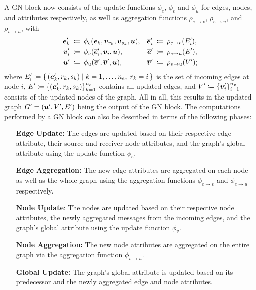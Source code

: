 A GN block now consists of the update functions $\phi_e$, $\phi_v$ and $\phi_u$ for edges,
nodes, and attributes respectively, as well as aggregation functions $\rho_{e \to v}$,
$\rho_{e \to u}$, and $\rho_{v \to u}$, with
\begin{align*}
    \boldsymbol{e}_k' \: &\coloneqq \: \phi_e(\boldsymbol{e}_k, \boldsymbol{v}_{r_k}, \boldsymbol{v}_{s_k}, \boldsymbol{u}), 
    &\overline{\boldsymbol{e}}'_i \: &\coloneqq \: \rho_{e \to v}(E_i'), \\
    \boldsymbol{v}_i' \: &\coloneqq \: \phi_v(\overline{\boldsymbol{e}}'_i, \boldsymbol{v}_i, \boldsymbol{u}), 
    &\overline{\boldsymbol{e}}' \: &\coloneqq \: \rho_{e \to u}(E'), \\
    \boldsymbol{u}' \: &\coloneqq \: \phi_u(\overline{\boldsymbol{e}}', \overline{\boldsymbol{v}}', \boldsymbol{u}),
    &\overline{\boldsymbol{v}}' \: &\coloneqq \: \rho_{v \to u}(V');
\end{align*}
where $E_i' \coloneqq \left\{\, (\boldsymbol{e}_k', r_k, s_k) \; \middle| \; k = 1, \dots, n_e, \; r_k = i \,\right\}$
is the set of incoming edges at node $i$, $E' \coloneqq \left\{(\boldsymbol{e}_k', r_k, s_k)\right\}_{k=1}^{n_e}$
contains all updated edges, and $V' \coloneqq \left\{\boldsymbol{v}_i'\right\}_{i=1}^{n_v}$ consists
of the updated nodes of the graph. All in all, this results in the updated graph 
$G' = (\boldsymbol{u}', V', E')$ being the output of the GN block.
The computations performed by a GN block can also be described in terms of the following phases:

\begin{enumerate}[align=left]
    \item[\textbf{Edge Update:}] The edges are updated based on their respective edge attribute, 
    their source and receiver node attributes, and the graph's global attribute using the
    update function $\phi_e$.
    \item[\textbf{Edge Aggregation:}] The new edge attributes are aggregated on each node
    as well as the whole graph using the aggregation functions $\phi_{e \to v}$ and
    $\phi_{e \to u}$ respectively.
    \item[\textbf{Node Update}:] The nodes are updated based on their respective
    node attributes, the newly aggregated messages from the incoming edges, and the graph's
    global attribute using the update function $\phi_v$.
    \item[\textbf{Node Aggregation:}] The new node attributes are aggregated on the entire
    graph via the aggregation function $\phi_{v \to u}$.
    \item[\textbf{Global Update:}] The graph's global attribute is updated based on its
    predecessor and the newly aggregated edge and node attributes.
\end{enumerate}

